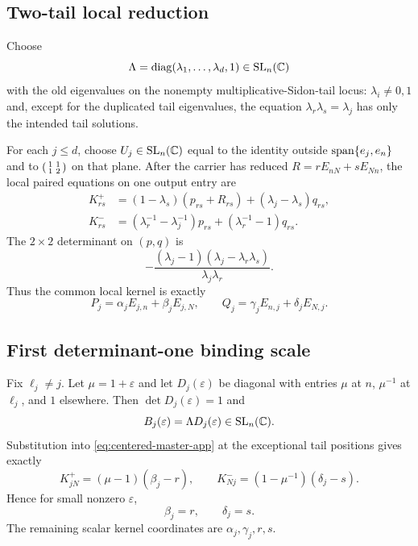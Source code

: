 \subsection{Two-tail local reduction}
Choose
\[
\Lambda=\operatorname{diag}(\lambda_1,\dots,\lambda_d,1)\in\operatorname{SL}_n(\mathbb C)
\]
with the old eigenvalues on the nonempty multiplicative-Sidon-tail locus: $\lambda_i\ne0,1$ and, except for the duplicated tail eigenvalues, the equation $\lambda_r\lambda_s=\lambda_j$ has only the intended tail solutions.

For each $j\le d$, choose $U_j\in\operatorname{SL}_n(\mathbb C)$ equal to the identity outside $\operatorname{span}\{e_j,e_n\}$ and to $\begin{psmallmatrix}1&1\\1&2\end{psmallmatrix}$ on that plane. After the carrier has reduced $R=rE_{nN}+sE_{Nn}$, the local paired equations on one output entry are
\begin{align}
K^+_{rs}&=(1-\lambda_s)(p_{rs}+R_{rs})+(\lambda_j-\lambda_s)q_{rs},\label{eq:local-plus}\\
K^-_{rs}&=(\lambda_r^{-1}-\lambda_j^{-1})p_{rs}
+(\lambda_r^{-1}-1)q_{rs}.\label{eq:local-minus}
\end{align}
The $2\times2$ determinant on $(p,q)$ is
\begin{equation}\label{eq:two-tail-det}
-\frac{(\lambda_j-1)(\lambda_j-\lambda_r\lambda_s)}{\lambda_j\lambda_r}.
\end{equation}
Thus the common local kernel is exactly
\begin{equation}\label{eq:two-tail-kernel}
P_j=\alpha_jE_{j,n}+\beta_jE_{j,N},\qquad
Q_j=\gamma_jE_{n,j}+\delta_jE_{N,j}.
\end{equation}

\subsection{First determinant-one binding scale}
Fix $\ell_j\ne j$. Let $\mu=1+\varepsilon$ and let $D_j(\varepsilon)$ be diagonal with entries $\mu$ at $n$, $\mu^{-1}$ at $\ell_j$, and $1$ elsewhere. Then $\det D_j(\varepsilon)=1$ and
\[
B_j(\varepsilon)=\Lambda D_j(\varepsilon)\in\operatorname{SL}_n(\mathbb C).
\]
Substitution into \eqref{eq:centered-master-app} at the exceptional tail positions gives exactly
\begin{equation}\label{eq:first-binding}
K^+_{jN}=(\mu-1)(\beta_j-r),\qquad
K^-_{Nj}=(1-\mu^{-1})(\delta_j-s).
\end{equation}
Hence for small nonzero $\varepsilon$,
\[
\beta_j=r,\qquad \delta_j=s.
\]
The remaining scalar kernel coordinates are $\alpha_j,\gamma_j,r,s$.

